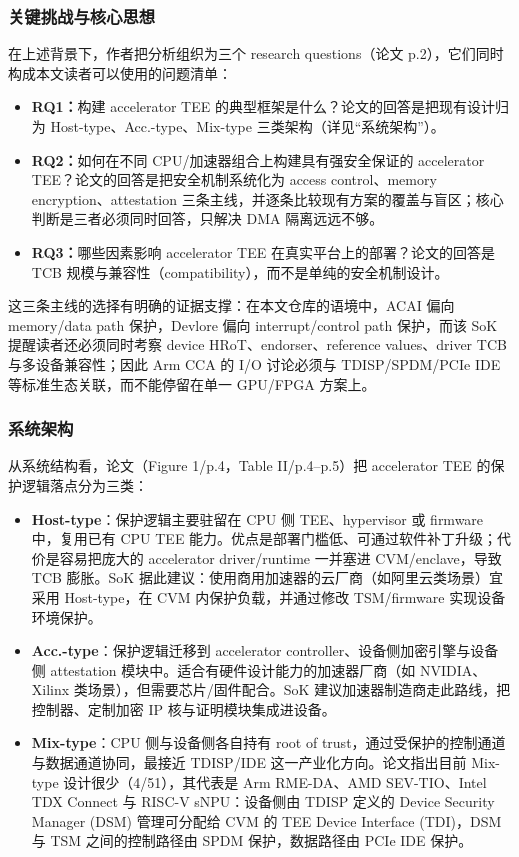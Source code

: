 \documentclass[11pt]{ctexart}
\begin{document}
\subsubsection{关键挑战与核心思想}
在上述背景下，作者把分析组织为三个 research questions（论文 p.2），它们同时构成本文读者可以使用的问题清单：\par
\begin{itemize}
\item \textbf{RQ1：}构建 accelerator TEE 的典型框架是什么？论文的回答是把现有设计归为 Host-type、Acc.-type、Mix-type 三类架构（详见``系统架构''）。
\item \textbf{RQ2：}如何在不同 CPU/加速器组合上构建具有强安全保证的 accelerator TEE？论文的回答是把安全机制系统化为 access control、memory encryption、attestation 三条主线，并逐条比较现有方案的覆盖与盲区；核心判断是三者必须同时回答，只解决 DMA 隔离远远不够。
\item \textbf{RQ3：}哪些因素影响 accelerator TEE 在真实平台上的部署？论文的回答是 TCB 规模与兼容性（compatibility），而不是单纯的安全机制设计。
\end{itemize}
这三条主线的选择有明确的证据支撑：在本文仓库的语境中，ACAI 偏向 memory/data path 保护，Devlore 偏向 interrupt/control path 保护，而该 SoK 提醒读者还必须同时考察 device HRoT、endorser、reference values、driver TCB 与多设备兼容性；因此 Arm CCA 的 I/O 讨论必须与 TDISP/SPDM/PCIe IDE 等标准生态关联，而不能停留在单一 GPU/FPGA 方案上。\par
\subsubsection{系统架构}
从系统结构看，论文（Figure 1/p.4，Table II/p.4--p.5）把 accelerator TEE 的保护逻辑落点分为三类：\par
\begin{itemize}
\item \textbf{Host-type}：保护逻辑主要驻留在 CPU 侧 TEE、hypervisor 或 firmware 中，复用已有 CPU TEE 能力。优点是部署门槛低、可通过软件补丁升级；代价是容易把庞大的 accelerator driver/runtime 一并塞进 CVM/enclave，导致 TCB 膨胀。SoK 据此建议：使用商用加速器的云厂商（如阿里云类场景）宜采用 Host-type，在 CVM 内保护负载，并通过修改 TSM/firmware 实现设备环境保护。
\item \textbf{Acc.-type}：保护逻辑迁移到 accelerator controller、设备侧加密引擎与设备侧 attestation 模块中。适合有硬件设计能力的加速器厂商（如 NVIDIA、Xilinx 类场景），但需要芯片/固件配合。SoK 建议加速器制造商走此路线，把控制器、定制加密 IP 核与证明模块集成进设备。
\item \textbf{Mix-type}：CPU 侧与设备侧各自持有 root of trust，通过受保护的控制通道与数据通道协同，最接近 TDISP/IDE 这一产业化方向。论文指出目前 Mix-type 设计很少（4/51），其代表是 Arm RME-DA、AMD SEV-TIO、Intel TDX Connect 与 RISC-V sNPU：设备侧由 TDISP 定义的 Device Security Manager (DSM) 管理可分配给 CVM 的 TEE Device Interface (TDI)，DSM 与 TSM 之间的控制路径由 SPDM 保护，数据路径由 PCIe IDE 保护。
\end{itemize}
\end{document}
